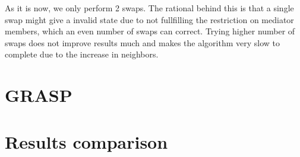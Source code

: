 \documentclass{article}
\begin{document}
As it is now, we only perform 2 swaps. The rational behind this is that a single swap might give a invalid state due to not fullfilling the restriction on mediator members, which an even number of swaps can correct. Trying higher number of swaps does not improve results much and makes the algorithm very slow to complete due to the increase in neighbors.

\section{GRASP}
\section{Results comparison}
\end{document}
